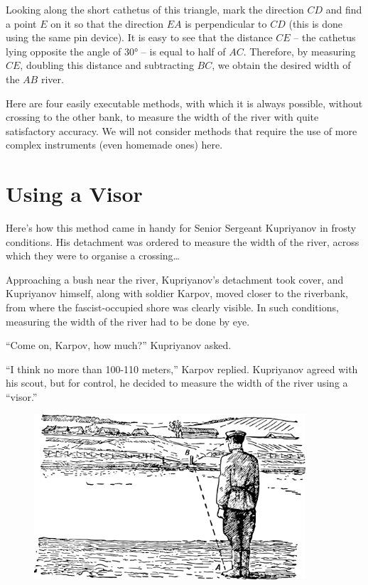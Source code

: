 \begin{enumerate}
\begin{marginfigure}[-2cm]
\end{marginfigure}
Looking along the short cathetus of this triangle, mark the direction $CD$ and find a point $E$ on it so that the direction $EA$ is perpendicular to $CD$ (this is done using the same pin device). It is easy to see that the distance $CE$ -- the cathetus lying opposite the angle of \ang{30} -- is equal to half of $AC$. Therefore, by measuring $CE$, doubling this distance and subtracting $BC$, we obtain the desired width of the $AB$ river.

\end{enumerate}

Here are four easily executable methods, with which it is always possible, without crossing to the other bank, to measure the width of the river with quite satisfactory accuracy. We will not consider methods that require the use of more complex instruments (even homemade ones) here.

\section{Using a Visor}
\label{sec-2.2}

Here's how this method came in handy for Senior Sergeant Kupriyanov in frosty conditions. His detachment was ordered to measure the width of the river, across which they were to organise a crossing\ldots{}

Approaching a bush near the river, Kupriyanov's detachment took cover, and Kupriyanov himself, along with soldier Karpov, moved closer to the riverbank, from where the fascist-occupied shore was clearly visible. In such conditions, measuring the width of the river had to be done by eye.

``Come on, Karpov, how much?'' Kupriyanov asked.

``I think no more than 100-110 meters,'' Karpov replied. Kupriyanov agreed with his scout, but for control, he decided to measure the width of the river using a ``visor.''

\begin{figure}[h!]
\centering
\includegraphics[width=0.9\textwidth]{figures/ch-02/fig-032.pdf}
\end{figure}

